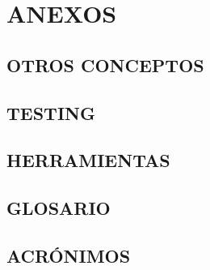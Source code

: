 \documentclass[12pt]{report}
\begin{document}

\appendix

\part*{ANEXOS}

\chapter{OTROS CONCEPTOS}\label{A}


\chapter{TESTING}


\chapter{HERRAMIENTAS}


\chapter{GLOSARIO}


\chapter{ACRÓNIMOS}


\end{document}
